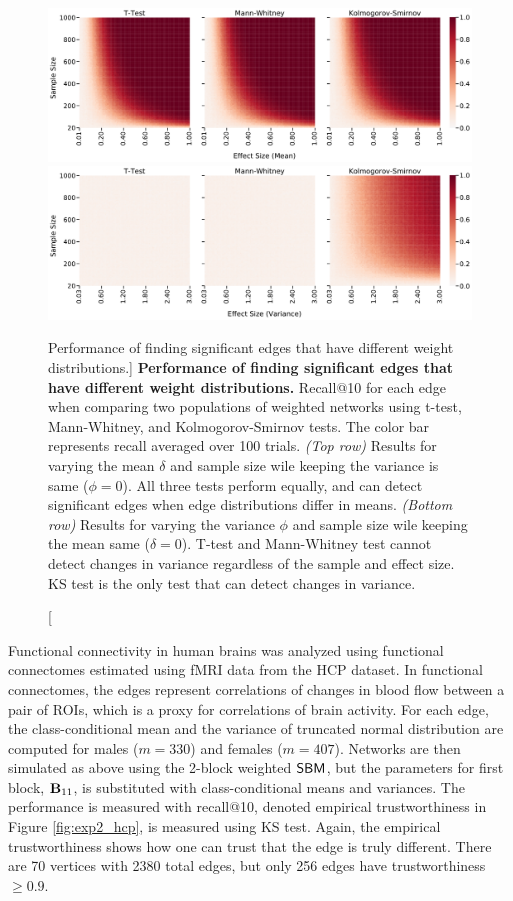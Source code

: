 \begin{figure}
    \includegraphics[width=.9\textwidth]{figures/dnd/exp2_change_mean}
    \includegraphics[width=.9\textwidth]{figures/dnd/exp2_change_vars}
    \caption
    [Performance of finding significant edges that have different weight distributions.]
    {\textbf{Performance of finding significant edges that have different weight distributions.}
    Recall@10 for each edge when comparing two populations of weighted networks using t-test, Mann-Whitney, and Kolmogorov-Smirnov tests. The color bar represents recall averaged over 100 trials. 
    \textit{(Top row)} Results for varying the mean $\delta$ and sample size wile keeping the variance is same ($\phi = 0$). All three tests perform equally, and can detect significant edges when edge distributions differ in means.
    \textit{(Bottom row)} Results for varying the variance $\phi$ and sample size wile keeping the mean same ($\delta = 0$). T-test and Mann-Whitney test cannot detect changes in variance regardless of the sample and effect size. KS test is the only test that can detect changes in variance.}
    \label{fig:exp2}
\end{figure}

Functional connectivity in human brains was analyzed using functional connectomes estimated using fMRI data from the HCP dataset. In functional connectomes, the edges represent correlations of changes in blood flow between a pair of ROIs, which is a proxy for correlations of brain activity. For each edge, the class-conditional mean and the variance of truncated normal distribution are computed for males ($m=330$) and females ($m=407$). Networks are then simulated as above using the 2-block weighted $\operatorname{\mathsf{SBM}}$, but the parameters for first block, $\operatorname{\mathbf{B}}_{11}$, is substituted with class-conditional means and variances. The performance is measured with recall@10, denoted empirical trustworthiness in Figure \ref{fig:exp2_hcp}, is measured using KS test. Again, the empirical trustworthiness shows how one can trust that the edge is truly different. There are 70 vertices with 2380 total edges, but only 256 edges have trustworthiness $\geq 0.9$.

